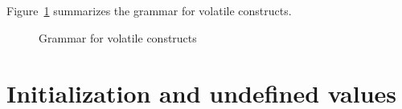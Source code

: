
\subsection{}
\label{sec:volatile-variables}

Figure~\ref{fig:gram:volatile} summarizes the grammar for volatile constructs.
\begin{figure}[htp]
  \begin{cadre}
      
    \end{cadre}
  \caption{Grammar for volatile constructs}
\label{fig:gram:volatile}
\end{figure}


\section{Initialization and undefined values}
\label{sec:initialized}
\nodiff



\section{}
\label{sec:dangling}
\nodiff



